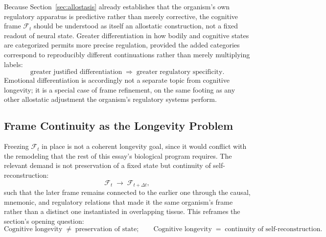 \documentclass[12pt]{article}
\begin{document}
Because Section~\ref{sec:allostasis} already establishes that the organism's own regulatory apparatus is predictive rather than merely corrective, the cognitive frame $\mathcal{F}_t$ should be understood as itself an allostatic construction, not a fixed readout of neural state. Greater differentiation in how bodily and cognitive states are categorized permits more precise regulation, provided the added categories correspond to reproducibly different continuations rather than merely multiplying labels:
\begin{equation}
\text{greater justified differentiation} \;\Rightarrow\; \text{greater regulatory specificity}.
\label{eq:differentiation-principle}
\end{equation}
Emotional differentiation is accordingly not a separate topic from cognitive longevity; it is a special case of frame refinement, on the same footing as any other allostatic adjustment the organism's regulatory systems perform.

\subsection{Frame Continuity as the Longevity Problem}

Freezing $\mathcal{F}_t$ in place is not a coherent longevity goal, since it would conflict with the remodeling that the rest of this essay's biological program requires. The relevant demand is not preservation of a fixed state but continuity of self-reconstruction:
\begin{equation}
\mathcal{F}_t \;\longrightarrow\; \mathcal{F}_{t + \Delta t},
\label{eq:frame-transformation}
\end{equation}
such that the later frame remains connected to the earlier one through the causal, mnemonic, and regulatory relations that made it the same organism's frame rather than a distinct one instantiated in overlapping tissue. This reframes the section's opening question:
\begin{equation}
\boxed{\text{Cognitive longevity} \;\ne\; \text{preservation of state}; \qquad \text{Cognitive longevity} \;=\; \text{continuity of self-reconstruction.}}
\label{eq:cognitive-longevity}
\end{equation}
\end{document}
